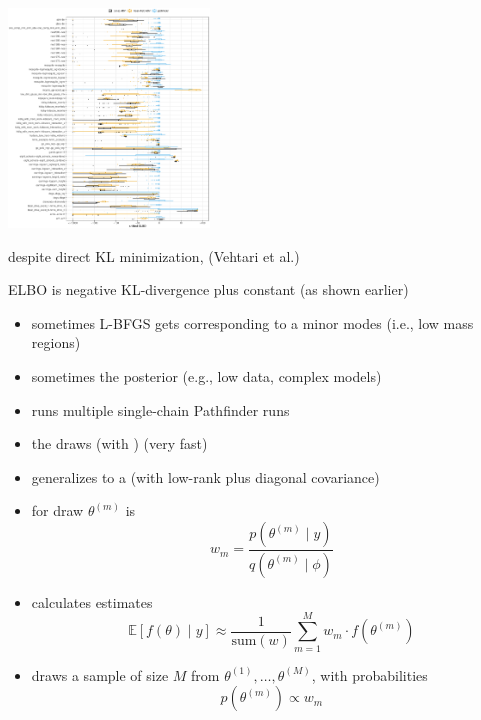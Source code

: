 \documentclass[9pt]{report}
\begin{document}
\vspace*{-10pt}
\begin{center}
  \includegraphics[width=0.4\textwidth]{img/elbo-eval.eps}
\end{center}
\vspace*{-10pt}
\begin{subitemize}
\item despite direct KL minimization,
  \hfill (Vehtari et al.)
\item ELBO is negative KL-divergence plus constant (as shown earlier)
\end{subitemize}


\begin{itemize}
\item sometimes L-BFGS gets  corresponding to a minor modes (i.e., low mass regions)
\item sometimes the posterior  (e.g., low data, complex models)
\item {} runs multiple single-chain Pathfinder runs 
\item {} the draws (with ) (very fast)
\item generalizes  to a  (with low-rank plus diagonal covariance)
\end{itemize}

\begin{itemize}
\item {} for draw $\theta^{(m)}$ is
  \[
    w_m = \frac{p(\theta^{(m)} \mid y)}
    {q(\theta^{(m)} \mid \phi)}
  \]
\item {} calculates estimates
  \[
    \mathbb{E}[f(\theta) \mid y]
    \approx \frac{1}{\textrm{sum}(w)} \sum_{m=1}^M w_m \cdot f(\theta^{(m)})
  \]
\item {} draws a sample of size $M$
   from $\theta^{(1)}, \ldots, \theta^{(M)}$,
  with probabilities 
\[
    p(\theta^{(m)}) \propto w_m
\]
\end{itemize}
\end{document}

